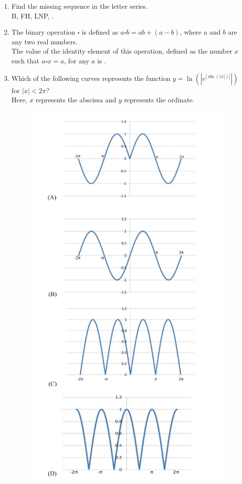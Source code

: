 \documentclass[journal,12pt,onecolumn]{IEEEtran}
\theoremstyle{remark}
\begin{document}
\begin{enumerate}
\item Find the missing sequence in the letter series.\\
B, FH, LNP, \underline{\hspace{1cm}}.
\hfill{}
\begin{enumerate}
\end{enumerate}

\item The binary operation $\square$ is defined as $a \square b = ab+(a-b)$, where $a$ and $b$ are any two real numbers.\\
The value of the identity element of this operation, defined as the number $x$ such that $a \square x = a$, for any $a$ is \underline{\hspace{1cm}}.
\hfill{}
\begin{enumerate}
\end{enumerate}

\item Which of the following curves represents the function $y = \ln(|e^{|\sin (|x|)|}|)$ for $|x| < 2\pi$?\\
Here, $x$ represents the abscissa and $y$ represents the ordinate.
\begin{figure}[H]
    \centering
\includegraphics[width=0.31\columnwidth]{figs/qn 10(1).jpg}
    \caption{}
    \label{fig:qn 10.jpg}
\end{figure}


\end{enumerate}
\end{document}
